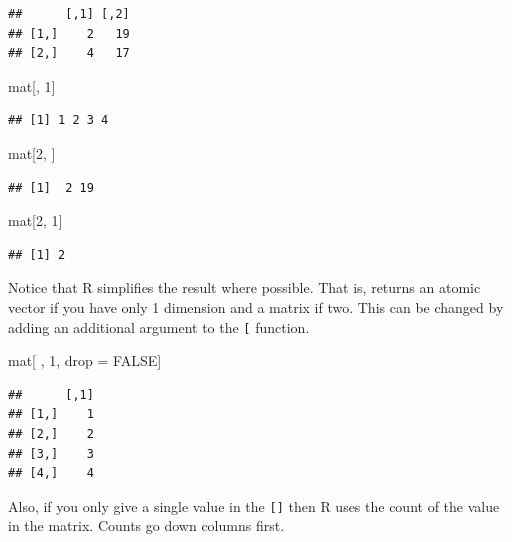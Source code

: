\documentclass[
]{book}
\newenvironment{Shaded}{\begin{snugshade}}{\end{snugshade}}
\newcommand{\DecValTok}[1]{\textcolor[rgb]{0.00,0.00,0.81}{#1}}
\newcommand{\NormalTok}[1]{#1}
\newcommand{\OtherTok}[1]{\textcolor[rgb]{0.56,0.35,0.01}{#1}}
\newcommand{\StringTok}[1]{\textcolor[rgb]{0.31,0.60,0.02}{#1}}
\theoremstyle{definition}
\theoremstyle{definition}
\theoremstyle{definition}
\theoremstyle{remark}
\begin{document}
\begin{verbatim}
##      [,1] [,2]
## [1,]    2   19
## [2,]    4   17
\end{verbatim}

\begin{Shaded}
\begin{Highlighting}[]
\NormalTok{mat[, }\DecValTok{1}\NormalTok{]}
\end{Highlighting}
\end{Shaded}

\begin{verbatim}
## [1] 1 2 3 4
\end{verbatim}

\begin{Shaded}
\begin{Highlighting}[]
\NormalTok{mat[}\DecValTok{2}\NormalTok{, ]}
\end{Highlighting}
\end{Shaded}

\begin{verbatim}
## [1]  2 19
\end{verbatim}

\begin{Shaded}
\begin{Highlighting}[]
\NormalTok{mat[}\DecValTok{2}\NormalTok{, }\DecValTok{1}\NormalTok{]}
\end{Highlighting}
\end{Shaded}

\begin{verbatim}
## [1] 2
\end{verbatim}

Notice that R simplifies the result where possible. That is, returns an atomic vector if you have only 1 dimension and a matrix if two. This can be changed by adding an additional argument to the \texttt{{[}} function.

\begin{Shaded}
\begin{Highlighting}[]
\NormalTok{mat[ , }\DecValTok{1}\NormalTok{, drop =}\StringTok{ }\OtherTok{FALSE}\NormalTok{]}
\end{Highlighting}
\end{Shaded}

\begin{verbatim}
##      [,1]
## [1,]    1
## [2,]    2
## [3,]    3
## [4,]    4
\end{verbatim}

Also, if you only give a single value in the \texttt{{[}{]}} then R uses the count of the value in the matrix. Counts go down columns first.
\end{document}
